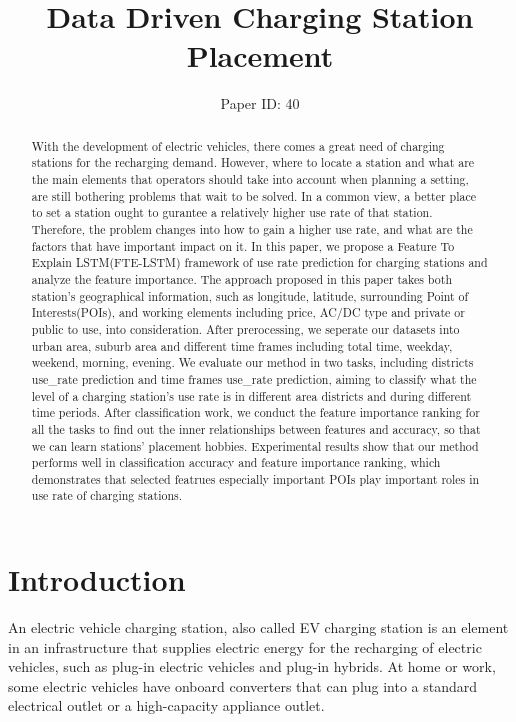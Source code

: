 \documentclass[runningheads]{llncs}
\begin{document}
%
\title{Data Driven Charging Station Placement}
\author{Paper ID: 40}
%
%
%
\maketitle              %
%
\begin{abstract}
With the development of electric vehicles, there comes a great need of charging stations for the recharging demand. However, where to locate a station and what are the main elements that operators should take into account when planning a setting, are still bothering problems that wait to be solved. In a common view, a better place to set a station ought to gurantee a relatively higher use rate of that station. Therefore, the problem changes into how to gain a higher use rate, and what are the factors that have important impact on it. In this paper, we propose a Feature To Explain LSTM(FTE-LSTM) framework of use rate prediction for charging stations and analyze the feature importance. The approach proposed in this paper takes both station's geographical information, such as longitude, latitude, surrounding Point of Interests(POIs), and working elements including price, AC/DC type and private or public to use, into consideration. After prerocessing, we seperate our datasets into urban area, suburb area and different time frames including total time, weekday, weekend, morning, evening. We evaluate our method in two tasks, including districts use\_rate prediction and time frames use\_rate prediction, aiming to classify what the level of a charging station's use rate is in different area districts and during different time periods. After classification work, we conduct the feature importance ranking for all the tasks to find out the inner relationships between features and accuracy, so that we can learn stations' placement hobbies. Experimental results show that our method performs well in classification accuracy and feature importance ranking, which demonstrates that selected featrues especially important POIs play important roles in use rate of charging stations.

\end{abstract}
%
%
%
\section{Introduction}
An electric vehicle charging station, also called EV charging station is an element in an infrastructure that supplies electric energy for the recharging of electric vehicles, such as plug-in electric vehicles and plug-in hybrids. At home or work, some electric vehicles have onboard converters that can plug into a standard electrical outlet or a high-capacity appliance outlet. 
\end{document}
